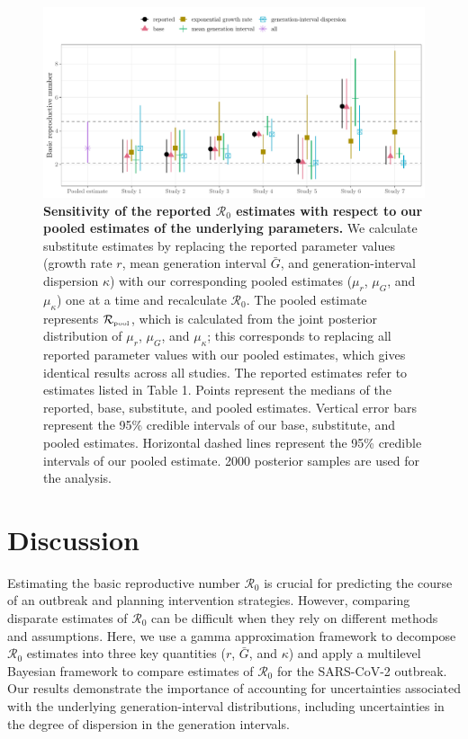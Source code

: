 \documentclass[12pt]{article}
\newcommand{\Ro}{\ensuremath{{\mathcal R}_{0}}\xspace}
\newcommand{\Rpool}{\ensuremath{{\mathcal R}_{\textrm{\tiny{pool}}}}\xspace}
\begin{document}
\begin{figure}[!th]
\includegraphics[width=\textwidth]{compare_R0.pdf}
\caption{
\textbf{Sensitivity of the reported \Ro estimates with respect to our pooled estimates of the underlying parameters.}
We calculate substitute estimates by replacing the reported parameter values (growth rate $r$, mean generation interval $\bar G$, and generation-interval dispersion $\kappa$) with our corresponding pooled estimates ($\mu_r$, $\mu_G$, and $\mu_\kappa$) one at a time and recalculate \Ro.
The pooled estimate represents \Rpool, which is calculated from the joint posterior distribution of $\mu_r$, $\mu_G$, and $\mu_\kappa$;
this corresponds to replacing all reported parameter values with our pooled estimates, which gives identical results across all studies.
The reported estimates refer to estimates listed in Table 1.
Points represent the medians of the reported, base, substitute, and pooled estimates.
Vertical error bars represent the 95\% credible intervals of our base, substitute, and pooled estimates.
Horizontal dashed lines represent the 95\% credible intervals of our pooled estimate.
2000 posterior samples are used for the analysis.
}
\label{fig:R0}
\end{figure}

\section{Discussion}

Estimating the basic reproductive number \Ro is crucial for predicting the course of an outbreak and planning intervention strategies.
However, comparing disparate estimates of \Ro can be difficult when they rely on different methods and assumptions.
Here, we use a gamma approximation framework \citep{park2019practical} to decompose \Ro estimates into three key quantities ($r$, $\bar G$, and $\kappa$) and apply a multilevel Bayesian framework to compare estimates of \Ro for the SARS-CoV-2 outbreak.
Our results demonstrate the importance of accounting for uncertainties associated with the underlying generation-interval distributions, including uncertainties in the degree of dispersion in the generation intervals.
\end{document}
